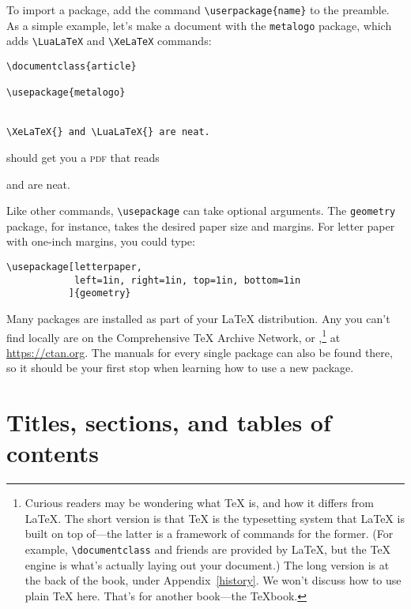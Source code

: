 To import a package, add the command \verb|\userpackage{name}|
to the preamble.
As a simple example, let's make a document with the \texttt{metalogo}
package, which adds \verb|\LuaLaTeX| and \verb|\XeLaTeX| commands:
\begin{leftfigure}
\begin{lstlisting}
\documentclass{article}

\usepackage{metalogo}


\XeLaTeX{} and \LuaLaTeX{} are neat.

\end{lstlisting}
\end{leftfigure}
\begin{samepage}
should get you a \textsc{pdf} that reads
\begin{leftfigure}
\lm \XeLaTeX{} and \LuaLaTeX{} are neat.
\end{leftfigure}
\end{samepage}
Like other commands, \verb|\usepackage| can take optional arguments.
The \texttt{geometry} package, for instance,
takes the desired paper size and margins.
For  letter paper with one-inch margins, you could type:
\begin{leftfigure}
\begin{lstlisting}
\usepackage[letterpaper,
            left=1in, right=1in, top=1in, bottom=1in
           ]{geometry}
\end{lstlisting}
\end{leftfigure}


Many packages are installed as part of your \LaTeX{} distribution.
Any you can't find locally are on the Comprehensive \TeX{}
Archive Network, or ,\punckern\footnote{Curious readers may
be wondering what \TeX{} is, and how it differs from \LaTeX.
The short version is that \TeX{} is the typesetting system that \LaTeX{}
is built on top of---the latter is a framework of commands for the former.
(For example, \texttt{\textbackslash documentclass} and friends are provided by
\LaTeX{}, but the \TeX{} engine is what's actually laying out your document.)
The long version is at the back of the book, under Appendix~\ref{history}.
We won't discuss how to use plain \TeX{} here. That's for another book---the
\TeX book.}
at \url{https://ctan.org}.
The manuals for every single package can also be found there,
so it should be your first stop when learning how to use a new package.

\section{Titles, sections, and tables of contents}

